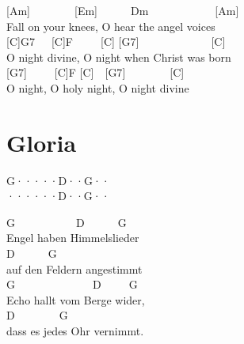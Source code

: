 \documentclass[
  letterpaper,
]{scrbook}
\begin{document}
{[}Am{]}~~~~~~~~{[}Em{]}~~~~~~Dm~~~~~~~~~~~~{[}Am{]}\\
Fall on your knees, O hear the angel voices\\
{[}C{]}G7~~~{[}C{]}F~~~~~{[}C{]} {[}G7{]}~~~~~~~~~~~~~{[}C{]}\\
O night divine, O night when Christ was born\\
{[}G7{]}~~~~~{[}C{]}F {[}C{]}~~{[}G7{]}~~~~~~~~{[}C{]}\\
O night, O holy night, O night divine

\hypertarget{gloria}{%
\chapter{Gloria}\label{gloria}}

\textbar G·····\textbar D··G··\textbar{}\\
\textbar······\textbar D··G··\textbar{}

G~~~~~~~~~~~D~~~~~~G\\
Engel haben Himmelslieder\\
\hspace*{0.333em}\hspace*{0.333em}\hspace*{0.333em}\hspace*{0.333em}\hspace*{0.333em}\hspace*{0.333em}\hspace*{0.333em}\hspace*{0.333em}\hspace*{0.333em}\hspace*{0.333em}\hspace*{0.333em}\hspace*{0.333em}\hspace*{0.333em}\hspace*{0.333em}\hspace*{0.333em}\hspace*{0.333em}D~~~~~~G\\
auf den Feldern angestimmt\\
G~~~~~~~~~~~~~~D~~~~~G\\
Echo hallt vom Berge wider,\\
\hspace*{0.333em}\hspace*{0.333em}\hspace*{0.333em}\hspace*{0.333em}\hspace*{0.333em}\hspace*{0.333em}\hspace*{0.333em}\hspace*{0.333em}\hspace*{0.333em}\hspace*{0.333em}\hspace*{0.333em}\hspace*{0.333em}\hspace*{0.333em}\hspace*{0.333em}D~~~~~~~~G\\
dass es jedes Ohr vernimmt.
\end{document}
